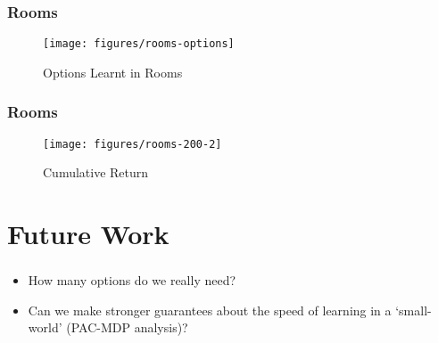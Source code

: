 \documentclass{beamer}
\begin{document}
\begin{frame}
    \frametitle{Rooms}
    \label{frame:results-rooms-domain}
    \begin{figure}[h]
        \centering
        \texttt{[image: figures/rooms-options]}
        \label{fig:rooms-domain}
        \caption{Options Learnt in Rooms}
    \end{figure}
\end{frame}

\begin{frame}
    \frametitle{Rooms}
    \label{frame:results-rooms-results}
    \begin{figure}[h]
        \centering
        \texttt{[image: figures/rooms-200-2]}
        \label{fig:rooms-return}
        \caption{Cumulative Return}
    \end{figure}
\end{frame}

\section{Future Work}

\begin{frame}
    \frametitle{}
    \label{frame:future-questions}
    
    \begin{itemize}
        \item How many options do we really need?
        \item Can we make stronger guarantees about the speed of learning in a
            `small-world' (PAC-MDP analysis)?
    \end{itemize}
\end{frame}
\end{document}
